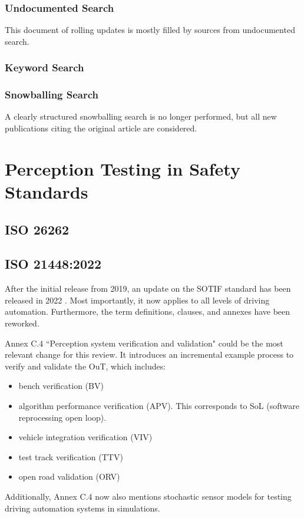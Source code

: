 \documentclass[conference]{IEEEtran}
\newcommand{\new}[1]{{\color{my-red}#1}}
\begin{document}
\subsubsection{Undocumented Search}
This document of rolling updates is mostly filled by sources from undocumented search.

\subsubsection{Keyword Search}
\subsubsection{Snowballing Search}
A clearly structured snowballing search is no longer performed, but all new publications citing the original article \cite{Hoss2022review} are considered.

\section{Perception Testing in Safety Standards}
\label{sec:standards}

\subsection{ISO 26262} 
\subsection{\new{ISO 21448:2022}} 

After the initial release from 2019, an update on the SOTIF standard has been released in 2022 \cite{iso2022sotif}. 
Most importantly, it now applies to all levels of driving automation. 
Furthermore, the term definitions, clauses, and annexes have been reworked. 

Annex C.4 ``Perception system verification and validation" could be the most relevant change for this review. 
It introduces an incremental example process to verify and validate the OuT, which includes: 
\begin{itemize}
\item bench verification (BV)
\item algorithm performance verification (APV). This corresponds to SoL (software reprocessing open loop).
\item vehicle integration verification (VIV)
\item test track verification (TTV)
\item open road validation (ORV)
\end{itemize}
Additionally, Annex C.4 now also mentions stochastic sensor models for testing driving automation systems in simulations. 
\end{document}
